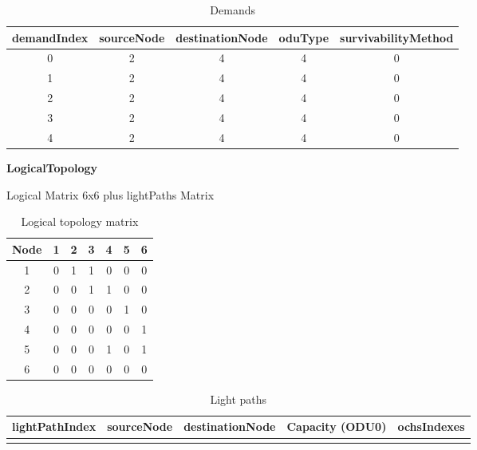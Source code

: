 \begin{table}[H]
	\centering
	\begin{tabular}{| c | c | c | c | c |}
		\hline
		\textbf{demandIndex} & \textbf{sourceNode} & \textbf{destinationNode} & \textbf{oduType} & \textbf{survivabilityMethod}\\ \hline
		0                    & 2                   & 4                        & 4                & 0						   \\ \hline
		1                    & 2                   & 4                        & 4                & 0                           \\ \hline
		2                    & 2                   & 4                        & 4                & 0                           \\ \hline
		3                    & 2                   & 4                        & 4                & 0                           \\ \hline
		4                    & 2                   & 4                        & 4                & 0                           \\ \hline
	\end{tabular}
	\caption{Demands}
	\label{demand_variable}
\end{table}


\textbf{LogicalTopology}

Logical Matrix 6x6 plus lightPaths Matrix 

\begin{table}[H]
	\centering
	\begin{tabular}{| c | c | c | c | c | c | c |}
		\hline
		\textbf{Node} & 1 & 2 & 3 & 4 & 5 & 6 \\ \hline
		1             & 0 & 1 & 1 & 0 & 0 & 0 \\ \hline
		2             & 0 & 0 & 1 & 1 & 0 & 0 \\ \hline
		3             & 0 & 0 & 0 & 0 & 1 & 0 \\ \hline
		4			  & 0 & 0 & 0 & 0 & 0 & 1 \\ \hline	
		5    	      & 0 & 0 & 0 & 1 & 0 & 1 \\ \hline
		6			  & 0 & 0 & 0 & 0 & 0 & 0 \\ \hline
	\end{tabular}
	\caption{Logical topology matrix}
	\label{logical_matrix}
\end{table}

\begin{table}[H]
	\centering
	\begin{tabular}{| c | c | c | c | c |}
		\hline
		\textbf{lightPathIndex} & \textbf{sourceNode} & \textbf{destinationNode} & \textbf{Capacity (ODU0)} & \textbf{ochsIndexes} \\ \hline
		&                     &                          &                          &                      \\ \hline        	
	\end{tabular}
	\caption{Light paths}
	\label{lps}
\end{table}

